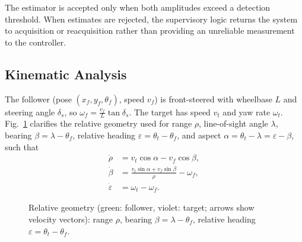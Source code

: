 \documentclass[journal,a4paper]{IEEEtran}
\begin{document}
The estimator is accepted only when both amplitudes exceed a detection threshold. When estimates are rejected, the supervisory logic returns the system to acquisition or reacquisition rather than providing an unreliable measurement to the controller.

\subsection{Kinematic Analysis}
\label{sec:kinematic}
The follower (pose $(x_f,y_f,\theta_f)$, speed $v_f$) is front-steered with wheelbase $L$ and steering angle $\delta_s$, so $\omega_f=\tfrac{v_f}{L}\tan\delta_s$. The target has speed $v_t$ and yaw rate $\omega_t$. Fig.~\ref{fig:geom} clarifies the relative geometry used for range $\rho$, line-of-sight angle $\lambda$, bearing $\beta=\lambda-\theta_f$, relative heading $\varepsilon=\theta_t-\theta_f$, and aspect $\alpha=\theta_t-\lambda=\varepsilon-\beta$, such that
\begin{equation}
\begin{aligned}
\dot\rho&=v_t\cos\alpha-v_f\cos\beta,\\
\dot\beta&=\frac{v_t\sin\alpha+v_f\sin\beta}{\rho}-\omega_f,\\
\dot\varepsilon&=\omega_t-\omega_f.
\end{aligned}
\label{eq:nl}
\end{equation}

\begin{figure}[!t]
\centering
{}
\caption{Relative geometry (green: follower, violet: target; arrows show velocity vectors): range $\rho$, bearing $\beta=\lambda-\theta_f$, relative heading $\varepsilon=\theta_t-\theta_f$.}
\label{fig:geom}
\end{figure}
\end{document}
